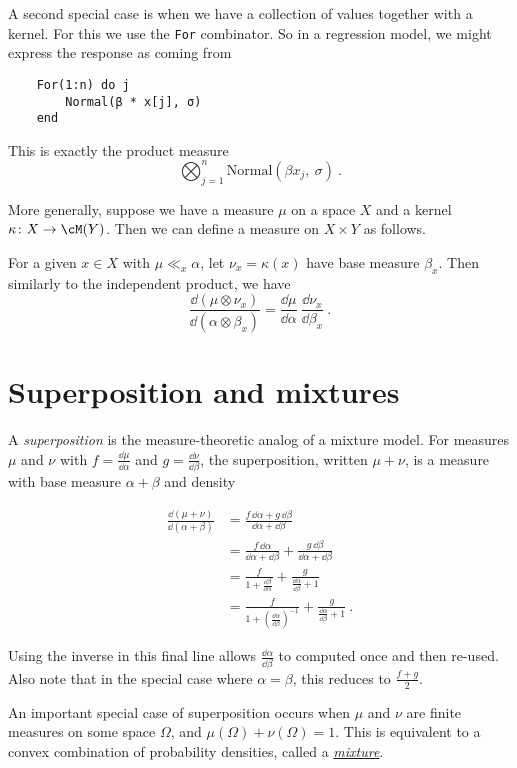 \documentclass{juliacon}
\begin{document}
A second special case is when we have a collection of values together with a kernel. For this we use the \verb|For| combinator. So in a regression model, we might express the response as coming from
\begin{verbatim}
    For(1:n) do j  
        Normal(β * x[j], σ)
    end
\end{verbatim}
This is exactly the product measure
\[
\bigotimes_{j=1}^n \text{Normal}(\beta x_j,\ \sigma)\ .
\]

More generally, suppose we have a measure $\mu$ on a space $X$ and a kernel $\kappa\colon X \to \cM(Y)$. Then we can define a measure on $X \times Y$ as follows.

For a given $x \in X$ with $\mu \ll_x \alpha$, let $\nu_x = \kappa(x)$ have base measure $\beta_x$. Then similarly to the independent product, we have
\[
\frac{\dd(\mu \otimes \nu_x)}{\dd(\alpha \otimes \beta_x)} = \frac{\dd\mu}{\dd\alpha}\ \frac{\dd\nu_x}{\dd\beta_x}\ .
\]


\section{Superposition and mixtures \label{superposition}}

A \emph{superposition} is the measure-theoretic analog of a mixture model. For measures $\mu$ and $\nu$ with $f=\frac{\dd\mu}{\dd\alpha}$ and $g=\frac{\dd\nu}{\dd\beta}$, the superposition, written $\mu + \nu$, is a measure with base measure $\alpha + \beta$ and density

\[
\begin{aligned}\frac{\dd(\mu+\nu)}{\dd(\alpha+\beta)} & =\frac{f\,\dd\alpha+g\,\dd\beta}{\dd\alpha+\dd\beta}\\
 & =\frac{f\,\dd\alpha}{\dd\alpha+\dd\beta}+\frac{g\,\dd\beta}{\dd\alpha+\dd\beta}\\
 & =\frac{f}{1+\frac{\dd\beta}{\dd\alpha}}+\frac{g}{\frac{\dd\alpha}{\dd\beta}+1}\\
 & =\frac{f}{1+\left(\frac{\dd\alpha}{\dd\beta}\right)^{-1}}+\frac{g}{\frac{\dd\alpha}{\dd\beta}+1}\ .
\end{aligned}
\]

Using the inverse in this final line allows $\frac{\dd\alpha}{\dd\beta}$ to computed once and then re-used. Also note that in the special case where $\alpha=\beta$, this reduces to $\frac{f+g}{2}$.

An important special case of superposition occurs when $\mu$ and $\nu$ are finite measures on some space $\Omega$, and $\mu(\Omega) + \nu(\Omega) = 1$. This is equivalent to a convex combination of probability densities, called a \href{https://en.wikipedia.org/wiki/Mixture_distribution}{\emph{mixture}}.
\end{document}
